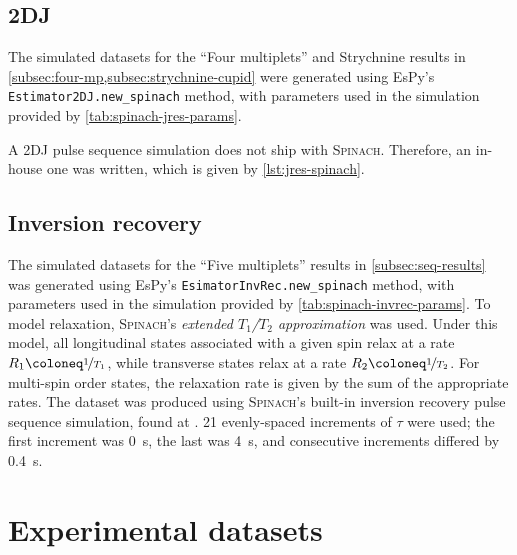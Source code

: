 

\subsection{\acs{2DJ}}
The simulated datasets for the ``Four multiplets'' and Strychnine results in
\cref{subsec:four-mp,subsec:strychnine-cupid} were generated
using \ac{EsPy}'s \texttt{Estimator2DJ.new_spinach} method, with
parameters used in the simulation provided by
\cref{tab:spinach-jres-params}.



A \ac{2DJ} pulse sequence simulation does not ship with \textsc{Spinach}.
Therefore, an in-house one was written, which is given by
\cref{lst:jres-spinach}.


\subsection{Inversion recovery}
\label{subsec:invrec-datasets}
The simulated datasets for the ``Five multiplets'' results in
\cref{subsec:seq-results} was generated using \ac{EsPy}'s
\texttt{EsimatorInvRec.new_spinach} method, with
parameters used in the simulation provided by
\cref{tab:spinach-invrec-params}.
To model relaxation, \textsc{Spinach}'s \emph{extended $T_1$/$T_2$ approximation} was
used\cite{SpinachRelax}. Under this model, all longitudinal states associated
with a given spin relax at a rate $R_1 \coloneq \nicefrac{1}{T_1}$, while
transverse states relax at a rate $R_2 \coloneq \nicefrac{1}{T_2}$. For
multi-spin order states, the relaxation rate is given by the sum of the
appropriate rates. The dataset was produced using \textsc{Spinach}'s built-in
inversion recovery pulse sequence simulation, found at
. 21 evenly-spaced increments of
$\tau$ were used; the first increment was \qty{0}{\second}, the last was
\qty{4}{\second}, and consecutive increments differed by \qty{0.4}{\second}.



\section{Experimental datasets}

